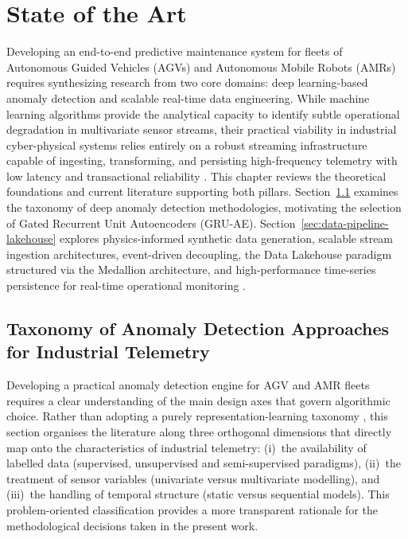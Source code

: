 \chapter{State of the Art}
\label{chap:state_of_the_art}

Developing an end-to-end predictive maintenance system for fleets of Autonomous Guided Vehicles (AGVs) and Autonomous Mobile Robots (AMRs) requires synthesizing research from two core domains: deep learning-based anomaly detection and scalable real-time data engineering.
While machine learning algorithms provide the analytical capacity to identify subtle operational degradation in multivariate sensor streams, their practical viability in industrial cyber-physical systems relies entirely on a robust streaming infrastructure capable of ingesting, transforming, and persisting high-frequency telemetry with low latency and transactional reliability \cite{mohna2024medallion}.
This chapter reviews the theoretical foundations and current literature supporting both pillars.
Section~\ref{sec:anomaly-taxonomy} examines the taxonomy of deep anomaly detection methodologies, motivating the selection of Gated Recurrent Unit Autoencoders (GRU-AE).
Section~\ref{sec:data-pipeline-lakehouse} explores physics-informed synthetic data generation, scalable stream ingestion architectures, event-driven decoupling, the Data Lakehouse paradigm structured via the Medallion architecture, and high-performance time-series persistence for real-time operational monitoring \cite{mohna2024medallion}.


\section{Taxonomy of Anomaly Detection Approaches for Industrial Telemetry}
\label{sec:anomaly-taxonomy}

Developing a practical anomaly detection engine for AGV and AMR fleets requires a clear understanding of the main design axes that govern algorithmic choice.
Rather than adopting a purely representation-learning taxonomy \cite{pang2021deep}, this section organises the literature along three orthogonal dimensions that directly map onto the characteristics of industrial telemetry: (i)~the availability of labelled data (supervised, unsupervised and semi-supervised paradigms), (ii)~the treatment of sensor variables (univariate versus multivariate modelling), and (iii)~the handling of temporal structure (static versus sequential models).
This problem-oriented classification provides a more transparent rationale for the methodological decisions taken in the present work.

